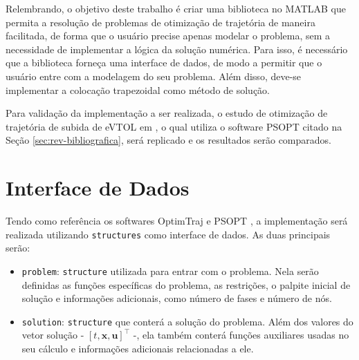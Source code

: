 
Relembrando, o objetivo deste trabalho é criar uma biblioteca no MATLAB que permita a resolução de problemas de otimização de trajetória de maneira facilitada, de forma que o usuário precise apenas modelar o problema, sem a necessidade de implementar a lógica da solução numérica. Para isso, é necessário que a biblioteca forneça uma interface de dados, de modo a permitir que o usuário entre com a modelagem do seu problema. Além disso, deve-se implementar a colocação trapezoidal como método de solução.

Para validação da implementação a ser realizada, o estudo de otimização de trajetória de subida de eVTOL em \cite{costa_otimizacao_2023}, o qual utiliza o software PSOPT citado na Seção \ref{sec:rev-bibliografica}, será replicado e os resultados serão comparados.


\section{Interface de Dados}
\label{sec:interface-dados}

Tendo como referência os softwares OptimTraj \cite{kelly_optimtraj_2022} e PSOPT \cite{becerra_psopt_2022}, a implementação será realizada utilizando \texttt{structures} como interface de dados. As duas principais serão:

\begin{itemize}
    \item \texttt{problem}: \texttt{structure} utilizada para entrar com o problema. Nela serão definidas as funções específicas do problema, as restrições, o palpite inicial de solução e informações adicionais, como número de fases e número de nós.
    \item \texttt{solution}: \texttt{structure} que conterá a solução do problema. Além dos valores do vetor solução - $\left[ t, \mathbf{x}, \mathbf{u} \right]^\intercal$ -, ela também conterá funções auxiliares usadas no seu cálculo e informações adicionais relacionadas a ele.
\end{itemize}

